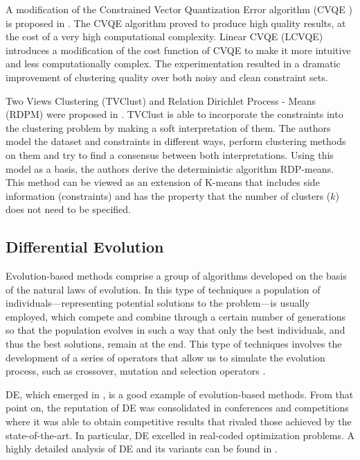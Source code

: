 \documentclass[review]{elsarticle}
\begin{document}
A modification of the Constrained Vector Quantization Error algorithm (CVQE \cite{davidson2005clustering}) is proposed in \cite{pelleg2007k}. The CVQE algorithm proved to produce high quality results, at the cost of a very high computational complexity. Linear CVQE (LCVQE) introduces a modification of the cost function of CVQE to make it more intuitive and less computationally complex. The experimentation resulted in a dramatic improvement of clustering quality over both noisy and clean constraint sets.

Two Views Clustering (TVClust) and Relation Dirichlet Process - Means (RDPM) were proposed in \cite{khashabi2015clustering}. TVClust is able to incorporate the constraints into the clustering problem by making a soft interpretation of them. The authors model the dataset and constraints in different ways, perform clustering methods on them and try to find a consensus between both interpretations. Using this model as a basis, the authors derive the deterministic algorithm RDP-means. This method can be viewed as an extension of K-means that includes side information (constraints) and has the property that the number of clusters ($k$) does not need to be specified.

\subsection{Differential Evolution} \label{sec:BackDE}

Evolution-based methods comprise a group of algorithms developed on the basis of the natural laws of evolution. In this type of techniques a population of individuals---representing potential solutions to the problem---is usually employed, which compete and combine through a certain number of generations so that the population evolves in such a way that only the best individuals, and thus the best solutions, remain at the end. This type of techniques involves the development of a series of operators that allow us to simulate the evolution process, such as crossover, mutation and selection operators \cite{fausto2019ants}. 

DE, which emerged in \cite{storn1997differential}, is a good example of evolution-based methods. From that point on, the reputation of DE was consolidated in conferences and competitions where it was able to obtain competitive results that rivaled those achieved by the state-of-the-art. In particular, DE excelled in real-coded optimization problems. A highly detailed analysis of DE and its variants can be found in \cite{das2011differential}.
\end{document}
